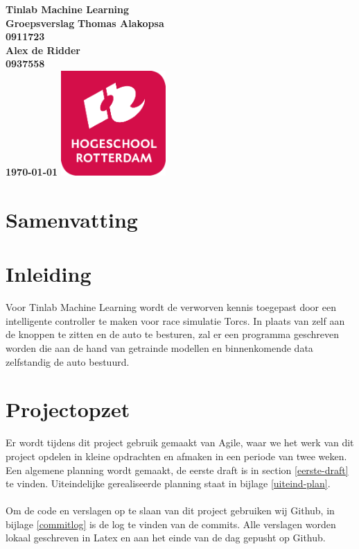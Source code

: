 \documentclass{article}
\begin{document}
\sffamily
\begin{titlepage}
  \centering
    \vfill
    {\bfseries\Huge
      Tinlab Machine Learning \\
      Groepsverslag
        \vskip2cm
      }
      {\bfseries\Large
      	Thomas Alakopsa\\
      	{ \bfseries\normalsize
      	0911723\\
      	}
      }
      {\bfseries\Large
      	Alex de Ridder\\
      	{ \bfseries\normalsize
      	0937558\\
      	}
      }
      {
        \bfseries\normalsize
        \vskip2cm
        \today
    }    
    \vfill
    \includegraphics[width=4cm]{logohr.png}
    \vfill
    \vfill
\end{titlepage}
\newpage

\section{Samenvatting}


\section{Inleiding}
Voor Tinlab Machine Learning wordt de verworven kennis toegepast door een intelligente controller te maken voor race simulatie Torcs. In plaats van zelf aan de knoppen te zitten en de auto te besturen, zal er een programma geschreven worden die aan de hand van getrainde modellen en binnenkomende data zelfstandig de auto bestuurd. 


\section{Projectopzet}
Er wordt tijdens dit project gebruik gemaakt van Agile, waar we het werk van dit project opdelen in kleine opdrachten en afmaken in een periode van twee weken. Een algemene planning wordt gemaakt, de eerste draft is in section \ref{eerste-draft} te vinden. Uiteindelijke gerealiseerde planning staat in bijlage \ref{uiteind-plan}.\\\\
Om de code en verslagen op te slaan van dit project gebruiken wij Github, in bijlage \ref{commitlog} is de log te vinden van de commits. Alle verslagen worden lokaal geschreven in Latex en aan het einde van de dag gepusht op Github.
\end{document}
